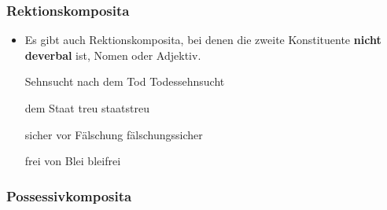 \begin{frame}
\frametitle{Rektionskomposita}

\begin{itemize}
	\item Es gibt auch Rektionskomposita, bei denen die zweite Konstituente \textbf{nicht deverbal} ist, \zB Nomen oder Adjektiv.
	
	\settowidth\jamwidth{[2 ArgumenteXXXXXXXXXXXXXXX]} 
	\ea 

		\ex Sehnsucht nach dem Tod
		\ex Todessehnsucht
		 
		\ex dem Staat treu
		\ex staatstreu
		
		\ex sicher vor Fälschung
		\ex fälschungssicher
		
		\ex frei von Blei
		\ex bleifrei
		\z 
	\z


		 
\end{itemize}

\end{frame}


\subsubsection{Possessivkomposita}


